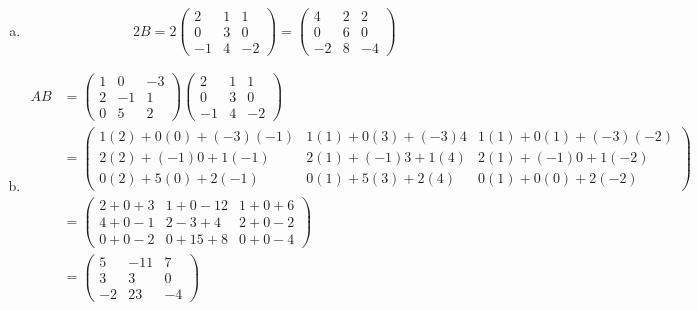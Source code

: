 \documentclass[11pt,letterpaper]{article}
\begin{document}
\sol 
\begin{enumerate}[(a)]
\item 
	\[
	2B= 2 \begin{pmatrix} 2 & 1 & 1 \\ 0 & 3 & 0 \\ -1 & 4 & -2 \end{pmatrix}= \begin{pmatrix} 4 & 2 & 2 \\ 0 & 6 & 0 \\ -2 & 8 & -4 \end{pmatrix}
	\] \pspace

\item 
	\[
	\begin{aligned}
	AB&= \begin{pmatrix} 1 & 0 & -3 \\ 2 & -1 & 1 \\ 0 & 5 & 2 \end{pmatrix} \begin{pmatrix} 2 & 1 & 1 \\ 0 & 3 & 0 \\ -1 & 4 & -2 \end{pmatrix} \\[0.3cm]
	&= \begin{pmatrix} 1(2) + 0(0) + (-3)(-1) & 1(1) + 0(3) + (-3)4 & 1(1) + 0(1) + (-3)(-2) \\ 2(2) + (-1)0 + 1(-1) & 2(1) + (-1)3 + 1(4) & 2(1) + (-1)0 + 1(-2) \\ 0(2) + 5(0) + 2(-1) & 0(1) + 5(3) + 2(4) & 0(1) + 0(0) + 2(-2) \end{pmatrix} \\[0.3cm]
	&= \begin{pmatrix} 2 + 0 + 3 & 1 + 0 - 12 & 1 + 0 + 6 \\ 4 + 0 - 1 & 2 - 3 + 4 & 2 + 0 - 2 \\ 0 + 0 - 2 & 0 + 15 + 8 & 0 + 0 - 4 \end{pmatrix} \\[0.3cm]
	&= \begin{pmatrix} 5 & -11 & 7 \\ 3 & 3 & 0 \\ -2 & 23 & -4 \end{pmatrix}
	\end{aligned}
	\] \pspace


\end{enumerate}
\end{document}
